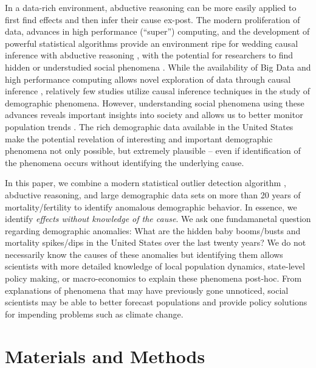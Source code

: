 \documentclass[12pt]{article}
\begin{document}
In a data-rich environment, abductive reasoning can be more easily
applied to first find effects and then infer their cause ex-post. The
modern proliferation of data, advances in high performance (``super'')
computing, and the development of powerful statistical algorithms
provide an environment ripe for wedding causal inference with abductive
reasoning \citep{van2016data, zikopoulos2011}, with the potential for
researchers to find hidden or understudied social phenomena
\citep{bohon2018demography}. While the availability of Big Data and high
performance computing allows novel exploration of data through causal
inference
\citep{bohon2018demography, rcausalimpact, shiffrin2016drawing},
relatively few studies utilize causal inference techniques in the study
of demographic phenomena. However, understanding social phenomena using
these advances reveals important insights into society
\citep{angrist1989lifetime, mas2009peers} and allows us to better
monitor population trends \citep{nobles2019, torche2015hidden}. The rich
demographic data available in the United States make the potential
revelation of interesting and important demographic phenomena not only
possible, but extremely plausible -- even if identification of the
phenomena occurs without identifying the underlying cause.

In this paper, we combine a modern statistical outlier detection
algorithm \citep{chen1993joint}, abductive reasoning, and large
demographic data sets on more than 20 years of mortality/fertility to
identify anomalous demographic behavior. In essence, we identify
\emph{effects without knowledge of the cause}. We ask one fundamanetal
question regarding demographic anomalies: What are the hidden baby
booms/busts and mortality spikes/dips in the United States over the last
twenty years? We do not necessarily know the causes of these anomalies
but identifying them allows scientists with more detailed knowledge of
local population dynamics, state-level policy making, or macro-economics
to explain these phenomena post-hoc. From explanations of phenomena that
may have previously gone unnoticed, social scientists may be able to
better forecast populations and provide policy solutions for impending
problems such as climate change.

\hypertarget{materials-and-methods}{%
\section{Materials and Methods}\label{materials-and-methods}}
\end{document}
